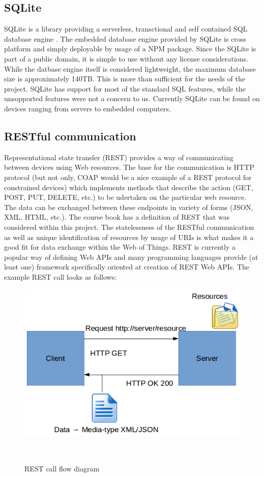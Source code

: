 \subsection{SQLite}
\label{subsec:sqlite}
SQLite is a library providing a serverless, transctional and self contained SQL database engine \citep{sqlite}. The embedded database engine provided by SQLite is cross platform and simply deployable by usage of a NPM package. Since the SQLite is part of a public domain, it is simple to use without any license considerations. While the datbase engine itself is considered lightweight, the maximum database size is approximately 140TB. This is more than sufficient for the needs of the project. SQLite has support for most of the standard SQL features, while the unsopported features were not a concern to us. Currently SQLite can be found on devices ranging from servers to embedded computers.

\subsection{RESTful communication}
\label{subsec:rest}
Representational state transfer (REST) provides a way of communicating between devices using Web resources. The base for the communication is HTTP protocol (but not only, COAP would be a nice example of a REST protocol for constrained devices) which implements methods that describe the action (GET, POST, PUT, DELETE, etc.) to be udertaken on the particular web resource. The data can be exchanged between these endpoints in variety of forms (JSON, XML, HTML, etc.). The course book \citep{Guinard:2016:BWT:3055920} has a definition of REST that was considered within this project. The statelessness of the RESTful communication as well as unique identification of resources by usage of URIs is what makes it a good fit for data exchange within the Web of Things. REST is currently a popular way of defining Web APIs and many programming languages provide (at least one) framework specifically oriented at creation of REST Web APIs. The example REST call looks as follows:

\begin{figure}[H]
\centering
\includegraphics[scale=0.5]{gfx/REST} 
\caption{REST call flow diagram}~\label{fig:REST}
\end{figure}

